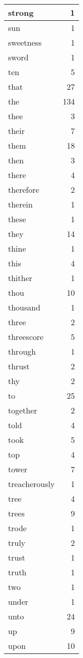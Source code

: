 \begin{center}
\begin{longtable}{l|r}
strong & 1\\ \hline 
sun & 1\\ \hline 
sweetness & 1\\ \hline 
sword & 1\\ \hline 
ten & 5\\ \hline 
that & 27\\ \hline 
the & 134\\ \hline 
thee & 3\\ \hline 
their & 7\\ \hline 
them & 18\\ \hline 
then & 3\\ \hline 
there & 4\\ \hline 
therefore & 2\\ \hline 
therein & 1\\ \hline 
these & 1\\ \hline 
they & 14\\ \hline 
thine & 1\\ \hline 
this & 4\\ \hline 
thither & 1\\ \hline 
thou & 10\\ \hline 
thousand & 1\\ \hline 
three & 2\\ \hline 
threescore & 5\\ \hline 
through & 1\\ \hline 
thrust & 2\\ \hline 
thy & 2\\ \hline 
to & 25\\ \hline 
together & 2\\ \hline 
told & 4\\ \hline 
took & 5\\ \hline 
top & 4\\ \hline 
tower & 7\\ \hline 
treacherously & 1\\ \hline 
tree & 4\\ \hline 
trees & 9\\ \hline 
trode & 1\\ \hline 
truly & 2\\ \hline 
trust & 1\\ \hline 
truth & 1\\ \hline 
two & 1\\ \hline 
under & 1\\ \hline 
unto & 24\\ \hline 
up & 9\\ \hline 
upon & 10\\ \hline 

\end{longtable}
\end{center}
